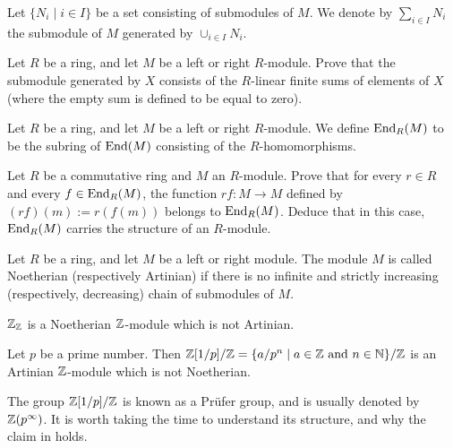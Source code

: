 \documentclass[11pt,a4paper]{article}
\begin{document}
\begin{definition}
  Let $\{N_i \mid i \in I\}$ be a set consisting of submodules of $M$.
  We denote by $\sum_{i \in I} N_i$ the submodule of $M$
  generated by $\cup_{i \in I} N_i$.
\end{definition}

\begin{exercise}
  Let $R$ be a ring, and let $M$ be a left or right $R$-module.
  Prove that the submodule generated by $X$ consists of the $R$-linear
  finite sums of elements of $X$ (where the empty sum is defined to be
  equal to zero).
\end{exercise}

\begin{definition}
  Let $R$ be a ring, and let $M$ be a left or right $R$-module.
  We define $\operatorname{End}_R(M)$ to be the subring of $\operatorname{End}(M)$ consisting of the
  $R$-homomorphisms.
\end{definition}

\begin{exercise}
  Let $R$ be a commutative ring and $M$ an $R$-module.
  Prove that for every $r \in R$ and every $f \in \operatorname{End}_R(M)$,
  the function $rf \colon M \to M$ defined by $(rf)(m) := r(f(m))$
  belongs to $\operatorname{End}_R(M)$.
  Deduce that in this case, $\operatorname{End}_R(M)$ carries the structure of an $R$-module.
\end{exercise}

\begin{definition}
  Let $R$ be a ring, and let $M$ be a left or right module.
  The module $M$ is called Noetherian (respectively Artinian)
  if there is no infinite and strictly increasing (respectively, decreasing)
  chain of submodules of $M$.
\end{definition}

\begin{example}
  $\mathbb{Z}_{\mathbb{Z}}$ is a Noetherian $\mathbb{Z}$-module which is not Artinian.
\end{example}

\begin{example}
  \label{ex:prufer}
  Let $p$ be a prime number.
  Then $\mathbb{Z}[1/p]/\mathbb{Z} = \{a/p^n \mid a \in \mathbb{Z} \text{ and } n \in \mathbb{N}\}/\mathbb{Z}$
  is an Artinian $\mathbb{Z}$-module which is not Noetherian.
\end{example}

\begin{remark}
  The group $\mathbb{Z}[1/p]/\mathbb{Z}$ is known as a Pr\"ufer group,
  and is usually denoted by $\mathbb{Z}(p^{\infty})$.
  It is worth taking the time to understand its structure,
  and why the claim in  holds.
\end{remark}
\end{document}
